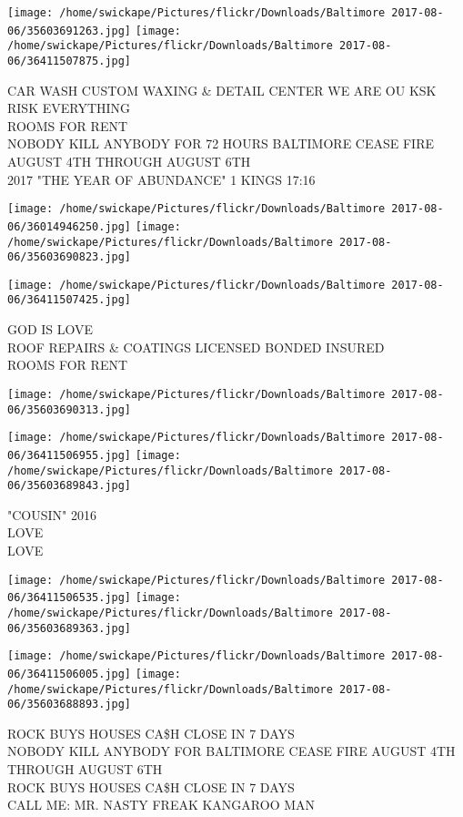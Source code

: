\documentclass[10pt,letterpaper]{article}
\begin{document}
\texttt{[image: /home/swickape/Pictures/flickr/Downloads/Baltimore 2017-08-06/35603691263.jpg]}
\texttt{[image: /home/swickape/Pictures/flickr/Downloads/Baltimore 2017-08-06/36411507875.jpg]}

CAR WASH CUSTOM WAXING \& DETAIL CENTER WE ARE OU KSK RISK EVERYTHING\\
ROOMS FOR RENT\\
NOBODY KILL ANYBODY FOR 72 HOURS BALTIMORE CEASE FIRE AUGUST 4TH THROUGH AUGUST 6TH\\
2017 "THE YEAR OF ABUNDANCE" 1 KINGS 17:16\\
\pagebreak

\texttt{[image: /home/swickape/Pictures/flickr/Downloads/Baltimore 2017-08-06/36014946250.jpg]}
\texttt{[image: /home/swickape/Pictures/flickr/Downloads/Baltimore 2017-08-06/35603690823.jpg]}

\texttt{[image: /home/swickape/Pictures/flickr/Downloads/Baltimore 2017-08-06/36411507425.jpg]}

GOD IS LOVE\\
ROOF REPAIRS \& COATINGS LICENSED BONDED INSURED\\
ROOMS FOR RENT\\
\pagebreak

\texttt{[image: /home/swickape/Pictures/flickr/Downloads/Baltimore 2017-08-06/35603690313.jpg]}

\vspace{0.25in}
\texttt{[image: /home/swickape/Pictures/flickr/Downloads/Baltimore 2017-08-06/36411506955.jpg]}
\texttt{[image: /home/swickape/Pictures/flickr/Downloads/Baltimore 2017-08-06/35603689843.jpg]}

"COUSIN" 2016\\
LOVE\\
LOVE\\
\pagebreak

\texttt{[image: /home/swickape/Pictures/flickr/Downloads/Baltimore 2017-08-06/36411506535.jpg]}
\texttt{[image: /home/swickape/Pictures/flickr/Downloads/Baltimore 2017-08-06/35603689363.jpg]}

\texttt{[image: /home/swickape/Pictures/flickr/Downloads/Baltimore 2017-08-06/36411506005.jpg]}
\texttt{[image: /home/swickape/Pictures/flickr/Downloads/Baltimore 2017-08-06/35603688893.jpg]}

ROCK BUYS HOUSES CA\$H CLOSE IN 7 DAYS\\
NOBODY KILL ANYBODY FOR BALTIMORE CEASE FIRE AUGUST 4TH THROUGH AUGUST 6TH\\
ROCK BUYS HOUSES CA\$H CLOSE IN 7 DAYS\\
CALL ME: MR. NASTY FREAK KANGAROO MAN\\
\pagebreak
\end{document}
